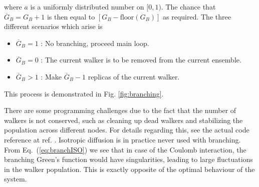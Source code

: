 where $a$ is a uniformly distributed number on $[0,1)$. The chance that $\overline{G}_B = G_B + 1$ is then equal to $\left[G_B - \mathrm{floor}(G_B)\right]$ as required. The three different scenarios which arise is

\begin{itemize}
 \item $\overline{G}_B = 1$ : No branching, proceed main loop.
 \item $\overline{G}_B = 0$ : The current walker is to be removed from the current ensemble.
 \item $\overline{G}_B > 1$ : Make $\overline{G}_B - 1$ replicas of the current walker.
\end{itemize}

This process is demonstrated in Fig. \ref{fig:branching}.

There are some programming challenges due to the fact that the number of walkers is not conserved, such as cleaning up dead walkers and stabilizing the population across different nodes. For details regarding this, see the actual code reference at ref. \cite{libBorealisCode}. Isotropic diffusion is in practice never used with branching. From Eq.~(\ref{eq:branchISO}) we see that in case of the Coulomb interaction, the branching Green's function would have singularities, leading to large fluctuations in the walker population. This is exactly opposite of the optimal behaviour of the system.

